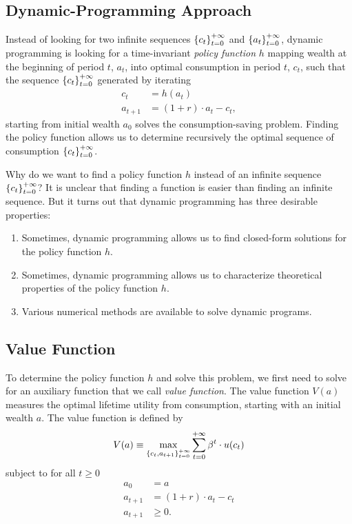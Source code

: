 \documentclass[letterpaper,12pt,leqno]{article}
\begin{document}
\subsection{Dynamic-Programming Approach}

Instead of looking for two infinite sequences $\left\lbrace c_t \right\rbrace_{t=0}^{+\infty}$ and $\left\lbrace a_t \right\rbrace_{t=0}^{+\infty}$, dynamic programming is looking for a time-invariant \textit{policy function} $h$ mapping wealth at the beginning of period $t$, $a_t$, into optimal consumption in period $t$,  $c_t$, such that the sequence $\left\lbrace c_t \right\rbrace_{t=0}^{+\infty}$ generated by iterating
\begin{align}
c_t&=h(a_t)\label{eq:iter1}\\
a_{t+1}&=(1+r)\cdot a_t-c_t,\label{eq:iter2}
\end{align}
starting from initial wealth $a_0$ solves the consumption-saving problem. Finding the policy function allows us to determine recursively the optimal sequence of consumption $\left\lbrace c_t \right\rbrace_{t=0}^{+\infty}$.

Why do we want to find a policy function $h$ instead of an infinite sequence $\left\lbrace c_t \right\rbrace_{t=0}^{+\infty}$? It is unclear that finding a function is easier than finding an infinite sequence. But it turns out that dynamic programming has three desirable properties:
\begin{enumerate}
\item Sometimes, dynamic programming allows us to find closed-form solutions for the policy function $h$.
\item Sometimes, dynamic programming allows us to characterize theoretical properties of the policy function $h$.
\item Various numerical methods are available to solve dynamic programs.
\end{enumerate}

\subsection{Value Function}

To determine the policy function $h$ and solve this problem, we first need to solve for an auxiliary function that we call \textit{value function}. The value function $V(a)$ measures the optimal lifetime utility from consumption, starting with an initial wealth $a$. The value function is defined by
\begin{equation}
V(a)\equiv \max[\bc{c_t,a_{t+1}}_{t=0}^{+\infty}] \sum_{t=0}^{+\infty}\b^t \cdot u(c_t)\label{eq:value}
\end{equation}
subject to for all $t\geq 0$
\begin{align*}
a_{0}&= a\\
a_{t+1}&=(1+r)\cdot a_t-c_t\\
a_{t+1}&\geq 0.
\end{align*}
\end{document}
